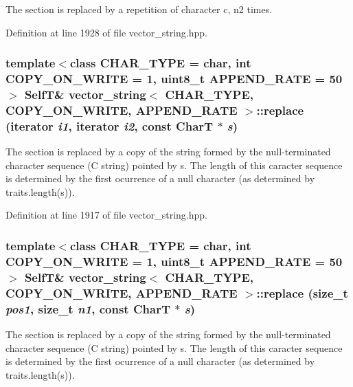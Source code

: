 The section is replaced by a repetition of character c, n2 times. 

Definition at line 1928 of file vector\_\-string.hpp.\hypertarget{classvector__string_17c5332dcb5ab7354aaef88da5238f88}{
\subsubsection[{replace}]{\setlength{\rightskip}{0pt plus 5cm}template$<$class CHAR\_\-TYPE  = char, int COPY\_\-ON\_\-WRITE = 1, uint8\_\-t APPEND\_\-RATE = 50$>$ {\bf SelfT}\& {\bf vector\_\-string}$<$ CHAR\_\-TYPE, COPY\_\-ON\_\-WRITE, APPEND\_\-RATE $>$::replace (iterator {\em i1}, \/  iterator {\em i2}, \/  const CharT $\ast$ {\em s})}}
\label{classvector__string_17c5332dcb5ab7354aaef88da5238f88}


The section is replaced by a copy of the string formed by the null-terminated character sequence (C string) pointed by s. The length of this caracter sequence is determined by the first ocurrence of a null character (as determined by traits.length(s)). 

Definition at line 1917 of file vector\_\-string.hpp.\hypertarget{classvector__string_37ba405b4c07993127d537b60885a57a}{
\subsubsection[{replace}]{\setlength{\rightskip}{0pt plus 5cm}template$<$class CHAR\_\-TYPE  = char, int COPY\_\-ON\_\-WRITE = 1, uint8\_\-t APPEND\_\-RATE = 50$>$ {\bf SelfT}\& {\bf vector\_\-string}$<$ CHAR\_\-TYPE, COPY\_\-ON\_\-WRITE, APPEND\_\-RATE $>$::replace (size\_\-t {\em pos1}, \/  size\_\-t {\em n1}, \/  const CharT $\ast$ {\em s})}}
\label{classvector__string_37ba405b4c07993127d537b60885a57a}


The section is replaced by a copy of the string formed by the null-terminated character sequence (C string) pointed by s. The length of this caracter sequence is determined by the first ocurrence of a null character (as determined by traits.length(s)). 

